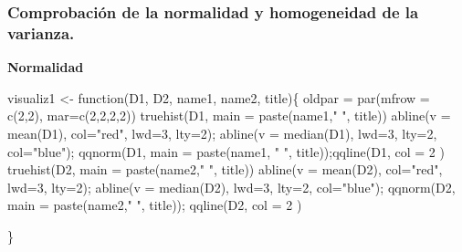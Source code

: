 \documentclass[
]{article}
\newenvironment{Shaded}{\begin{snugshade}}{\end{snugshade}}
\newcommand{\ControlFlowTok}[1]{\textcolor[rgb]{0.94,0.87,0.69}{#1}}
\newcommand{\DataTypeTok}[1]{\textcolor[rgb]{0.87,0.87,0.75}{#1}}
\newcommand{\DecValTok}[1]{\textcolor[rgb]{0.86,0.86,0.80}{#1}}
\newcommand{\KeywordTok}[1]{\textcolor[rgb]{0.94,0.87,0.69}{#1}}
\newcommand{\NormalTok}[1]{\textcolor[rgb]{0.80,0.80,0.80}{#1}}
\newcommand{\StringTok}[1]{\textcolor[rgb]{0.80,0.58,0.58}{#1}}
\begin{document}
\hypertarget{comprobaciuxf3n-de-la-normalidad-y-homogeneidad-de-la-varianza.}{%
\subsubsection{Comprobación de la normalidad y homogeneidad de la
varianza.}\label{comprobaciuxf3n-de-la-normalidad-y-homogeneidad-de-la-varianza.}}

\textbf{Normalidad}

\begin{Shaded}
\begin{Highlighting}[]
\NormalTok{ visualiz1 <-}\StringTok{ }\ControlFlowTok{function}\NormalTok{(D1, D2, name1, name2, title)\{}
\NormalTok{   oldpar =}\StringTok{ }\KeywordTok{par}\NormalTok{(}\DataTypeTok{mfrow =} \KeywordTok{c}\NormalTok{(}\DecValTok{2}\NormalTok{,}\DecValTok{2}\NormalTok{), }\DataTypeTok{mar=}\KeywordTok{c}\NormalTok{(}\DecValTok{2}\NormalTok{,}\DecValTok{2}\NormalTok{,}\DecValTok{2}\NormalTok{,}\DecValTok{2}\NormalTok{))}
  \KeywordTok{truehist}\NormalTok{(D1, }\DataTypeTok{main =} \KeywordTok{paste}\NormalTok{(name1,}\StringTok{" "}\NormalTok{, title))}
  \KeywordTok{abline}\NormalTok{(}\DataTypeTok{v =} \KeywordTok{mean}\NormalTok{(D1), }\DataTypeTok{col=}\StringTok{"red"}\NormalTok{, }\DataTypeTok{lwd=}\DecValTok{3}\NormalTok{, }\DataTypeTok{lty=}\DecValTok{2}\NormalTok{);}
  \KeywordTok{abline}\NormalTok{(}\DataTypeTok{v =} \KeywordTok{median}\NormalTok{(D1), }\DataTypeTok{lwd=}\DecValTok{3}\NormalTok{, }\DataTypeTok{lty=}\DecValTok{2}\NormalTok{, }\DataTypeTok{col=}\StringTok{"blue"}\NormalTok{);}
  \KeywordTok{qqnorm}\NormalTok{(D1, }\DataTypeTok{main =} \KeywordTok{paste}\NormalTok{(name1, }\StringTok{" "}\NormalTok{, title));}\KeywordTok{qqline}\NormalTok{(D1, }\DataTypeTok{col =} \DecValTok{2}\NormalTok{ )}
  \KeywordTok{truehist}\NormalTok{(D2, }\DataTypeTok{main =} \KeywordTok{paste}\NormalTok{(name2,}\StringTok{" "}\NormalTok{, title))}
  \KeywordTok{abline}\NormalTok{(}\DataTypeTok{v =} \KeywordTok{mean}\NormalTok{(D2), }\DataTypeTok{col=}\StringTok{"red"}\NormalTok{, }\DataTypeTok{lwd=}\DecValTok{3}\NormalTok{, }\DataTypeTok{lty=}\DecValTok{2}\NormalTok{);}
  \KeywordTok{abline}\NormalTok{(}\DataTypeTok{v =} \KeywordTok{median}\NormalTok{(D2), }\DataTypeTok{lwd=}\DecValTok{3}\NormalTok{, }\DataTypeTok{lty=}\DecValTok{2}\NormalTok{, }\DataTypeTok{col=}\StringTok{"blue"}\NormalTok{);}
  \KeywordTok{qqnorm}\NormalTok{(D2, }\DataTypeTok{main =} \KeywordTok{paste}\NormalTok{(name2,}\StringTok{" "}\NormalTok{, title)); }\KeywordTok{qqline}\NormalTok{(D2, }\DataTypeTok{col =} \DecValTok{2}\NormalTok{ )}

\NormalTok{\}}
\end{Highlighting}
\end{Shaded}
\end{document}
